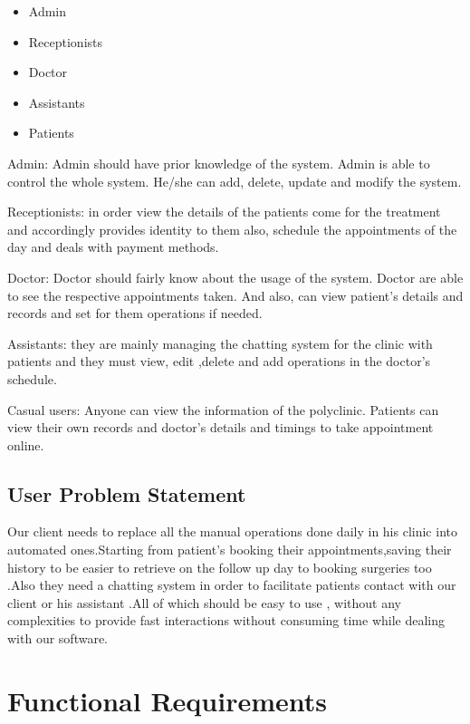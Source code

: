 \documentclass[]{article}
\begin{document}
\begin{itemize}
  \item Admin
  \item Receptionists
  \item Doctor
  \item Assistants
  \item Patients
  
  
\end{itemize}

Admin: Admin should have prior knowledge of the system. Admin is able to control the whole system. He/she can add, delete, update and modify the system.


Receptionists: in order view the details of the patients come for the treatment and accordingly provides identity to them also, schedule the appointments of the day and deals with payment methods. 


Doctor: Doctor should fairly know about the usage of the system. Doctor are able to see the respective appointments taken. And also, can view patient’s details and records and set for them operations if needed.


Assistants: they are mainly managing the chatting system for the clinic with patients and they must  view, edit ,delete and add operations in the doctor’s schedule.


Casual users: Anyone can view the information of the polyclinic. Patients can view their own records and doctor’s details and timings to take appointment online.


\subsection{ User Problem Statement}
Our client needs to replace all the manual operations done daily in his clinic into automated ones.Starting from patient's booking their appointments,saving their history to be easier to retrieve on the follow up day to booking surgeries too .Also they need a chatting system in order to facilitate patients contact with our client or his assistant .All of which should be easy to use , without any complexities to provide fast interactions without consuming time while dealing with our software.

\section{Functional Requirements}
\end{document}
